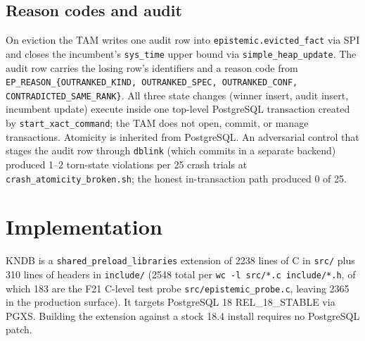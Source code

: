 \documentclass[sigconf, nonacm]{acmart}
\begin{document}
\subsection{Reason codes and audit}
On eviction the TAM writes one audit row into \texttt{epistemic.evicted\_fact} via SPI and closes the incumbent's \texttt{sys\_time} upper bound via \texttt{simple\_heap\_update}. The audit row carries the losing row's identifiers and a reason code from \texttt{EP\_REASON\_\{OUTRANKED\_KIND, OUTRANKED\_SPEC, OUTRANKED\_CONF, CONTRADICTED\_SAME\_RANK\}}. All three state changes (winner insert, audit insert, incumbent update) execute inside one top-level PostgreSQL transaction created by \texttt{start\_xact\_command}; the TAM does not open, commit, or manage transactions. Atomicity is inherited from PostgreSQL. An adversarial control that stages the audit row through \texttt{dblink} (which commits in a separate backend) produced 1--2 torn-state violations per 25 crash trials at \texttt{crash\_atomicity\_broken.sh}; the honest in-transaction path produced 0 of 25.

\section{Implementation}
\label{sec:implementation}

KNDB is a \texttt{shared\_preload\_libraries} extension of 2238 lines of C in \texttt{src/} plus 310 lines of headers in \texttt{include/} (2548 total per \texttt{wc -l src/*.c include/*.h}, of which 183 are the F21 C-level test probe \texttt{src/epistemic\_probe.c}, leaving 2365 in the production surface). It targets PostgreSQL 18 REL\_18\_STABLE via PGXS. Building the extension against a stock 18.4 install requires no PostgreSQL patch.
\end{document}
